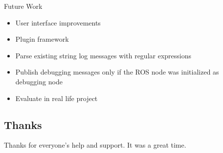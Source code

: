 \documentclass[compress]{beamer}
\begin{document}
\begin{frame}{Future Work}
\begin{itemize}
\item User interface improvements
\item Plugin framework
\item Parse existing string log messages with regular expressions
\item Publish debugging messages only if the ROS node was initialized as debugging node
\item Evaluate in real life project
\end{itemize}
\end{frame}

\subsection{Thanks}

\begin{frame}
\begin{center}
\huge
Thanks for everyone's help and support. It was a great time.
\end{center}
\end{frame}
\end{document}
